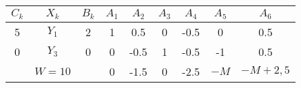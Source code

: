     \begin{tabular}{ccccccccc}
    \hline
    \hline
    $C_k$   & $X_k$   & $B_k$   & $A_1$   & $A_2$   & $A_3$   & $A_4$   & $A_5$   & $A_6$ \bigstrut\\
    \hline
    5       & $Y_1$   & 2       & 1       & 0.5     & 0       & -0.5    & 0       & 0.5 \bigstrut[t]\\
    0       & $Y_3$   & 0       & 0       & -0.5    & 1       & -0.5    & -1      & 0.5 \bigstrut[b]\\
    \hline
            & $W=10$  &         & 0       & -1.5    & 0       & -2.5    & $-M$    & $-M+2,5$ \bigstrut\\
    \hline
    \hline
    \end{tabular}%
